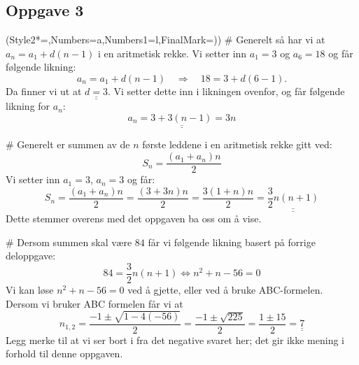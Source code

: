 \documentclass[12pt, a4paper]
{article}						%
\def\answer#1{\underline{\underline{#1}}}
\begin{document}
\subsection*{Oppgave 3}
\begin{easylist}[enumerate]
	\ListProperties(Style2*=,Numbers=a,Numbers1=l,FinalMark={)})
	# Generelt så har vi at $a_n = a_1 + d(n-1)$ i en aritmetisk rekke. Vi setter inn $a_1 = 3$ og $a_6 = 18$ og
	får følgende likning:
	\begin{equation*}
		a_n = a_1 + d(n-1) \quad \Rightarrow \quad 18 = 3 + d(6-1).
	\end{equation*}
	Da finner vi ut at $\answer{d = 3}$. Vi setter dette inn i likningen ovenfor, og får følgende likning for $a_n$:
	\begin{equation*}
		\answer{a_n = 3 + 3(n-1) = 3n}
	\end{equation*}
	
	# Generelt er summen av de $n$ første leddene i en aritmetisk rekke gitt ved:
	\begin{equation*}
		S_n = \frac{\left(a_1 + a_n\right)n}{2}
	\end{equation*}
	Vi setter inn $a_1 = 3$, $a_n = 3$ og får:
	\begin{equation*}
		S_n = \frac{\left(a_1 + a_n\right)n}{2} = \frac{\left(3 + 3n\right)n}{2} = 
		\frac{3\left(1 + n\right)n}{2} = \answer{\frac{3}{2} n \left(n+1\right)}
	\end{equation*}
	Dette stemmer overens med det oppgaven ba oss om å vise.
	
	# Dersom summen skal være $84$ får vi følgende likning basert på forrige deloppgave:
	\begin{equation*}
		84 = \frac{3}{2} n \left(n+1\right) \Leftrightarrow n^2 + n - 56 = 0
	\end{equation*}
	Vi kan løse $n^2 + n - 56 = 0$ ved å gjette, eller ved å bruke ABC-formelen. Dersom vi bruker ABC formelen får vi at
	\begin{equation*}
		n_{1,2} = \frac{-1 \pm \sqrt{1 - 4 (-56)}}{2} = \frac{-1 \pm \sqrt{225}}{2} = 
		\frac{1 \pm 15}{2} = \answer{7}
	\end{equation*}
	Legg merke til at vi ser bort i fra det negative svaret her; det gir ikke mening i forhold til denne oppgaven.
\end{easylist}
\end{document}
